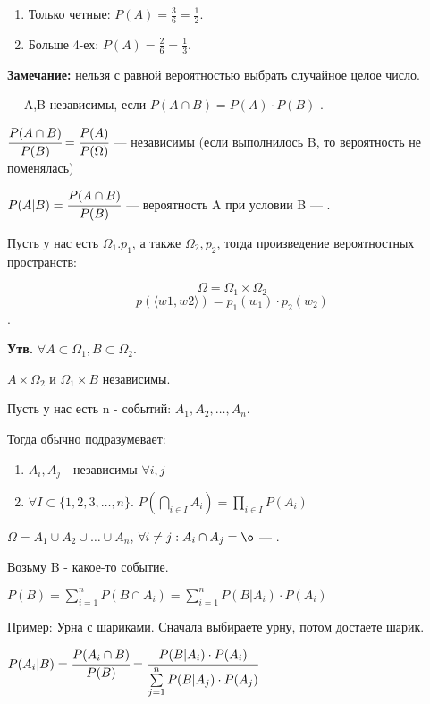 \begin{enumerate}
\item Только четные: $P(A) = \frac{3}{6}=\frac{1}{2}$.
\item Больше 4-ех: $P(A) = \frac{2}{6}=\frac{1}{3}$.
\end{enumerate}

\textbf{Замечание:} нельзя с равной вероятностью выбрать случайное целое число. 

 --- A,B независимы, если $P(A \cap B) = P(A) \cdot P(B)$ .

$\cfrac{P(A \cap B)}{ P(B)}  = \cfrac{P(A)}{P(\Omega)}$ --- независимы (если выполнилось B, то вероятность не поменялась)

$P(A | B) = \cfrac{P(A \cap B)}{P(B)}$ --- вероятность A при условии B ---
.


Пусть у нас есть $\Omega_1. p_1$, а также $\Omega_2,p_2$, тогда произведение вероятностных пространств:

\[\Omega = \Omega_1 \times \Omega_2\] \[p(\langle w1,w2\rangle) = p_1(w_1) \cdot p_2(w_2)\].

\textbf{Утв.} $\forall A \subset \Omega_1, B \subset \Omega_2$.

$A \times \Omega_2 $ и $\Omega_1 \times B $  независимы.

Пусть у нас есть n - событий: $A_1, A_2, \ldots, A_n$.

Тогда обычно  подразумевает:

\begin{enumerate}
    \item $A_i, A_j $ - независимы $\forall i,j$
    \item $\forall I \subset \{1,2,3,\ldots, n\}$. $P(\bigcap\limits_{i \in I }A_i) = \prod\limits_{i \in I} P(A_i)$
\end{enumerate}


$\Omega = A_1 \cup A_2 \cup \ldots \cup A_n $, $\forall i \neq j: A_i \cap A_j = \o$ --- .

Возьму B - какое-то событие.

$P(B) = \sum\limits_{i=1}^n P(B \cap A_i) =  \sum\limits_{i=1}^n P(B| A_i) \cdot P(A_i)$

Пример: Урна с шариками. Сначала выбираете урну, потом достаете шарик.


$P(A_i | B) = \cfrac{P(A_i\cap B)}{P(B)} = \cfrac{P(B| A_i) \cdot P(A_i)}{\sum\limits_{j=1}^n P(B| A_j) \cdot P(A_j)}$


